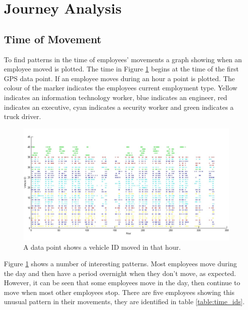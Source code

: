 \section{Journey Analysis}
\label{sec:journeyanalysis}
\subsection{Time of Movement}
\label{sec:timeofmovement}

To find patterns in the time of employees’ movements a graph showing when an employee moved is plotted. The time in Figure \ref{fig:MoveTime} begins at the time of the first GPS data point. If an employee moves during an hour a point is plotted. The colour of the marker indicates the employees current employment type. Yellow indicates an information technology worker, blue indicates an engineer, red indicates an executive, cyan indicates a security worker and green indicates a truck driver.   

\begin{figure}[H]
\centering
\includegraphics[width=1.2\textwidth]{MoveTime.jpg}
\caption{\label{fig:MoveTime}A data point shows a vehicle ID moved in that hour.}
\end{figure}


\noindent Figure \ref{fig:MoveTime} shows a number of interesting patterns. Most employees move during the day and then have a period overnight when they don’t move, as expected. However, it can be seen that some employees move in the day, then continue to move when most other employees stop. There are five employees showing this unusual pattern in their movements, they are identified in table \ref{table:time_ids}. \\


